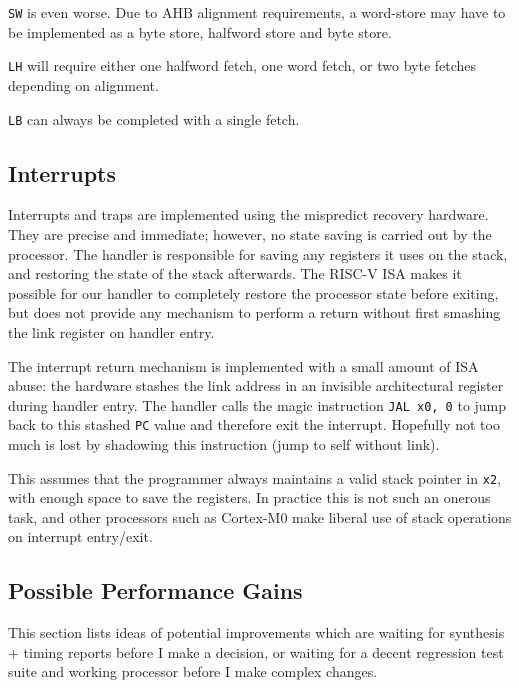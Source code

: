 \documentclass{article}
\begin{document}
\texttt{SW} is even worse. Due to AHB alignment requirements, a word-store may have to be implemented as a byte store, halfword store and byte store.

\texttt{LH} will require either one halfword fetch, one word fetch, or two byte fetches depending on alignment.

\texttt{LB} can always be completed with a single fetch.



\subsection{Interrupts}

Interrupts and traps are implemented using the mispredict recovery hardware. They are precise and immediate; however, no state saving is carried out by the processor. The handler is responsible for saving any registers it uses on the stack, and restoring the state of the stack afterwards. The RISC-V ISA makes it possible for our handler to completely restore the processor state before exiting, but does not provide any mechanism to perform a return without first smashing the link register on handler entry.

The interrupt return mechanism is implemented with a small amount of ISA abuse: the hardware stashes the link address in an invisible architectural register during handler entry. The handler calls the magic instruction \texttt{JAL x0, 0} to jump back to this stashed \texttt{PC} value and therefore exit the interrupt. Hopefully not too much is lost by shadowing this instruction (jump to self without link).

This assumes that the programmer always maintains a valid stack pointer in \texttt{x2}, with enough space to save the registers. In practice this is not such an onerous task, and other processors such as Cortex-M0 make liberal use of stack operations on interrupt entry/exit.

\subsection{Possible Performance Gains}

This section lists ideas of potential improvements which are waiting for synthesis + timing reports before I make a decision, or waiting for a decent regression test suite and working processor before I make complex changes.
\end{document}
